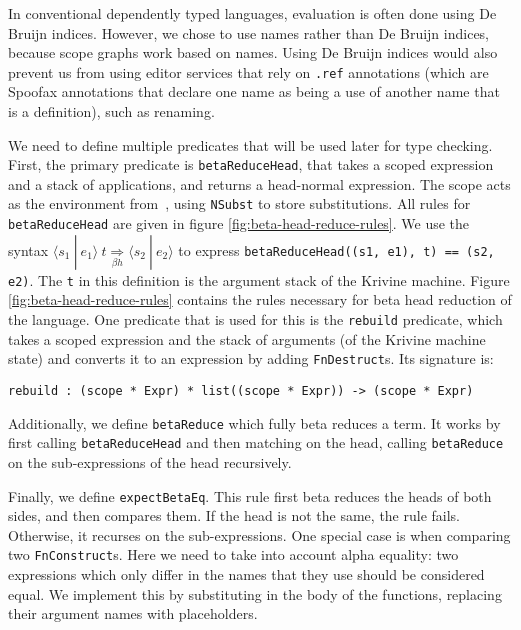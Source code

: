 \documentclass[a4paper,UKenglish,cleveref, autoref, thm-restate]{oasics-v2021}
\newcommand{\scope}[2]{\langle#1 \: | \: #2\rangle}
\newcommand{\bhr}[3]{ #1 \: #2 \underset{\beta h}{\Rightarrow} #3 }
\begin{document}
In conventional dependently typed languages, evaluation is often done using De Bruijn indices. However, we chose to use names rather than De Bruijn indices, because scope graphs work based on names. Using De Bruijn indices would also prevent us from using editor services that rely on \verb|.ref| annotations (which are Spoofax annotations that declare one name as being a use of another name that is a definition), such as renaming.

We need to define multiple predicates that will be used later for type checking. First, the primary predicate is \verb|betaReduceHead|, that takes a scoped expression and a stack of applications, and returns a head-normal expression. The scope acts as the environment from~\cite{krivine}, using \verb|NSubst| to store substitutions. All rules for \verb|betaReduceHead| are given in figure \ref{fig:beta-head-reduce-rules}. We use the syntax $\bhr{\scope{s_1}{e_1}}{t}{\scope{s_2}{e_2}}$ to express \verb|betaReduceHead((s1, e1), t) == (s2, e2)|. The \verb|t| in this definition is the argument stack of the Krivine machine. Figure \ref{fig:beta-head-reduce-rules} contains the rules necessary for beta head reduction of the language. One predicate that is used for this is the \verb|rebuild| predicate, which takes a scoped expression and the stack of arguments (of the Krivine machine state) and converts it to an expression by adding \verb|FnDestruct|s. Its signature is:
\begin{lstlisting}
rebuild : (scope * Expr) * list((scope * Expr)) -> (scope * Expr)
\end{lstlisting}

Additionally, we define \verb|betaReduce| which fully beta reduces a term. It works by first calling \verb|betaReduceHead| and then matching on the head, calling \verb|betaReduce| on the sub-expressions of the head recursively.

Finally, we define \verb|expectBetaEq|. This rule first beta reduces the heads of both sides, and then compares them. If the head is not the same, the rule fails. Otherwise, it recurses on the sub-expressions. One special case is when comparing two \verb|FnConstruct|s. Here we need to take into account alpha equality: two expressions which only differ in the names that they use should be considered equal. We implement this by substituting in the body of the functions, replacing their argument names with placeholders. 
\end{document}
